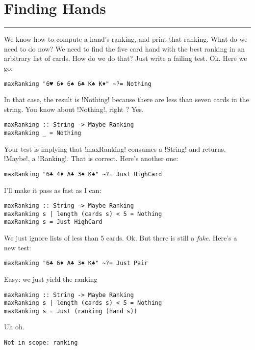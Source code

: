 \newpage
\section{Finding Hands} 
\vspace{10cm}
\hrule

\lhQ We know how to compute a hand's ranking, and print that ranking. What do we need to do now?
\lhA We need to find the five card hand with the best ranking in an arbitrary list of cards.
\lhN How do we do that?
\lhA Just write a failing test.
\lhN Ok. Here we go:
\begin{lstlisting}[frame=single]
maxRanking "6♥ 6♦ 6♠ 6♣ K♠ K♦" ~?= Nothing
\end{lstlisting}
In that case, the result is \il!Nothing! because there are less than seven cards in the string. You know about \il!Nothing!, right ?
\lhA \error Yes. 
\begin{lstlisting}[frame=single]
maxRanking :: String -> Maybe Ranking
maxRanking _ = Nothing
\end{lstlisting}
\success Your test is implying that \il!maxRanking! consumes a \il!String! and returns, \il!Maybe!, a \il!Ranking!. 
\lhN That is correct. Here's another one:
\begin{lstlisting}[frame=single]
maxRanking "6♣ 4♦ A♣ 3♠ K♠" ~?= Just HighCard
\end{lstlisting}
\lhA \failure I'll make it pass as fast as I can:
\begin{lstlisting}[frame=single]
maxRanking :: String -> Maybe Ranking
maxRanking s | length (cards s) < 5 = Nothing
maxRanking s = Just HighCard
\end{lstlisting}
\success We just ignore lists of less than 5 cards.
\lhN Ok. But there is still a \emph{fake}. Here's a new test:
\begin{lstlisting}[frame=single]
maxRanking "6♣ 6♦ A♣ 3♠ K♠" ~?= Just Pair
\end{lstlisting}
\lhA Easy: we just yield the ranking
\begin{lstlisting}[frame=single]
maxRanking :: String -> Maybe Ranking
maxRanking s | length (cards s) < 5 = Nothing
maxRanking s = Just (ranking (hand s))
\end{lstlisting}
\error Uh oh.
\lhN
\begin{small}
\begin{verbatim}
Not in scope: ranking
\end{verbatim}
\end{small}
